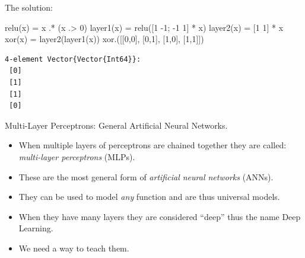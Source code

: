 \documentclass[
  ignorenonframetext,
]{beamer}
\newenvironment{Shaded}{\begin{snugshade}}{\end{snugshade}}
\newcommand{\FloatTok}[1]{\textcolor[rgb]{0.68,0.00,0.00}{#1}}
\newcommand{\FunctionTok}[1]{\textcolor[rgb]{0.28,0.35,0.67}{#1}}
\newcommand{\NormalTok}[1]{\textcolor[rgb]{0.00,0.23,0.31}{#1}}
\newcommand{\OperatorTok}[1]{\textcolor[rgb]{0.37,0.37,0.37}{#1}}
\begin{document}
\begin{frame}[fragile]{The solution:}
\protect\hypertarget{the-solution}{}
\begin{Shaded}
\begin{Highlighting}[]
\FunctionTok{relu}\NormalTok{(x) }\OperatorTok{=}\NormalTok{ x }\OperatorTok{.*}\NormalTok{ (x }\OperatorTok{.\textgreater{}} \FloatTok{0}\NormalTok{)}
\FunctionTok{layer1}\NormalTok{(x) }\OperatorTok{=} \FunctionTok{relu}\NormalTok{([}\FloatTok{1} \OperatorTok{{-}}\FloatTok{1}\NormalTok{; }\OperatorTok{{-}}\FloatTok{1} \FloatTok{1}\NormalTok{] }\OperatorTok{*}\NormalTok{ x)}
\FunctionTok{layer2}\NormalTok{(x) }\OperatorTok{=}\NormalTok{ [}\FloatTok{1} \FloatTok{1}\NormalTok{] }\OperatorTok{*}\NormalTok{ x}
\FunctionTok{xor}\NormalTok{(x) }\OperatorTok{=} \FunctionTok{layer2}\NormalTok{(}\FunctionTok{layer1}\NormalTok{(x))}
\FunctionTok{xor}\NormalTok{.([[}\FloatTok{0}\NormalTok{,}\FloatTok{0}\NormalTok{], [}\FloatTok{0}\NormalTok{,}\FloatTok{1}\NormalTok{], [}\FloatTok{1}\NormalTok{,}\FloatTok{0}\NormalTok{], [}\FloatTok{1}\NormalTok{,}\FloatTok{1}\NormalTok{]])}
\end{Highlighting}
\end{Shaded}

\begin{verbatim}
4-element Vector{Vector{Int64}}:
 [0]
 [1]
 [1]
 [0]
\end{verbatim}
\end{frame}

\begin{frame}{Multi-Layer Perceptrons: General Artificial Neural
Networks.}
\protect\hypertarget{multi-layer-perceptrons-general-artificial-neural-networks.}{}
\begin{itemize}
\item
  When multiple layers of perceptrons are chained together they are
  called: \emph{multi-layer perceptrons} (MLPs).
\item
  These are the most general form of \emph{artificial neural networks}
  (ANNs).
\end{itemize}
\end{frame}

\begin{frame}{}
\protect\hypertarget{section-5}{}
\begin{itemize}
\item
  They can be used to model \emph{any} function and are thus universal
  models.
\item
  When they have many layers they are considered ``deep'' thus the name
  Deep Learning.
\item
  We need a way to teach them.
\end{itemize}
\end{frame}
\end{document}
